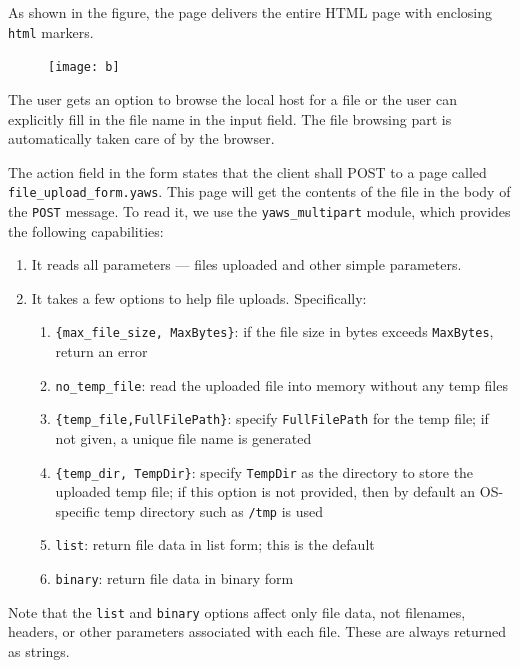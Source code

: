 \documentclass[11pt,oneside,english]{book}
\begin{document}
As shown in the figure, the page delivers the entire HTML page with
enclosing \verb+html+ markers.


\begin{figure}[h]
\begin{center}

 \texttt{[image: b]}

\end{center}
\end{figure}

The user gets an option to browse the local host for a file
or the user can explicitly fill in the file name in the input
field. The file browsing part is automatically taken care of by the
browser.

The action field in the form states that the client shall POST to a
page called \verb+file_upload_form.yaws+. This page will get the
contents of the file in the body of the \verb+POST+ message. To read
it, we use the \verb+yaws_multipart+ module, which provides the
following capabilities:

\begin{enumerate}
\item It reads all parameters --- files uploaded and other simple
  parameters.
\item It takes a few options to help file uploads. Specifically:
\begin{enumerate}
\item \verb+{max_file_size, MaxBytes}+: if the file size in bytes
  exceeds \verb+MaxBytes+, return an error
\item \verb+no_temp_file+: read the uploaded file into memory without
  any temp files
\item \verb+{temp_file,FullFilePath}+: specify \verb+FullFilePath+ for
  the temp file; if not given, a unique file name is generated
\item \verb+{temp_dir, TempDir}+: specify \verb+TempDir+ as the
  directory to store the uploaded temp file; if this option is not
  provided, then by default an OS-specific temp directory such as
  \verb+/tmp+ is used
\item \verb+list+: return file data in list form; this is the default
\item \verb+binary+: return file data in binary form
\end{enumerate}
\end{enumerate}

Note that the \verb+list+ and \verb+binary+ options affect only file
data, not filenames, headers, or other parameters associated with each
file. These are always returned as strings.
\end{document}
